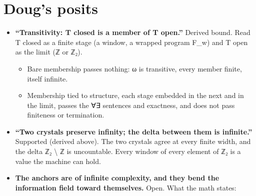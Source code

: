 \section{\texorpdfstring{Doug's posits}{Doug's posits}}

\begin{itemize}
\item \textbf{“Transitivity: T closed is a member of T open.”} Derived bound. Read T closed as a finite stage (a window, a wrapped program F\_\allowbreak{}w) and T open as the limit (ℤ or ℤ₂).

\begin{itemize}
\item Bare membership passes nothing: ω is transitive, every member finite, itself infinite.
\item Membership tied to structure, each stage embedded in the next and in the limit, passes the ∀∃ sentences and exactness, and does not pass finiteness or termination.
\end{itemize}
\item \textbf{“Two crystals preserve infinity; the delta between them is infinite.”} Supported (derived above). The two crystals agree at every finite width, and the delta ℤ₂ \textbackslash{} ℤ is uncountable. Every window of every element of ℤ₂ is a value the machine can hold.
\item \textbf{The anchors are of infinite complexity, and they bend the information field toward themselves.} Open. What the math states:


\end{itemize}
